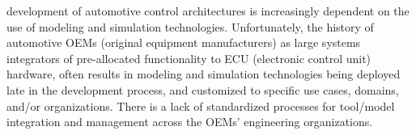 
% 
% 
% 
% 

 development of automotive control architectures is increasingly dependent on the use of modeling and simulation technologies.
Unfortunately, the history of automotive OEMs (original equipment
manufacturers) as large systems integrators of pre-allocated functionality to ECU (electronic control unit) hardware,
often results in modeling and simulation technologies being deployed %
late in the development process,
and customized to specific use cases, domains, and/or organizations.
There is a lack of standardized processes for tool/model integration and management across the OEMs' engineering organizations. 
